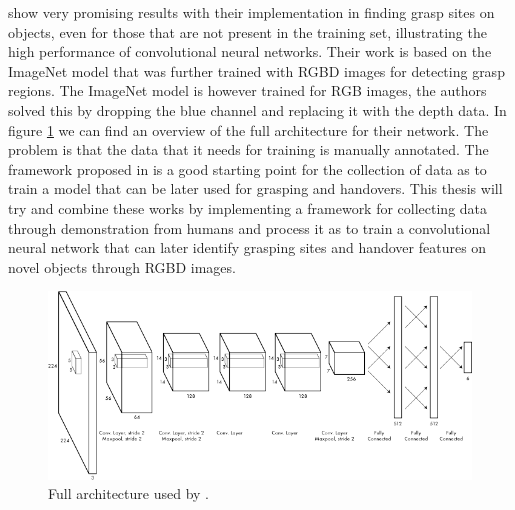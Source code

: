 \textcite{Redmon2014} show very promising results with their implementation in finding grasp sites on objects, even for those that are not present in the training set, illustrating the high performance of convolutional neural networks. Their work is based on the ImageNet model that was further trained with RGBD images for detecting grasp regions. The ImageNet model is however trained for RGB images, the authors solved this by dropping the blue channel and replacing it with the depth data. In figure \ref{fig:rel__cnn-arch} we can find an overview of the full architecture for their network. The problem is that the data that it needs for training is manually annotated. The framework proposed in \parencite{Chan2015a} is a good starting point for the collection of data as to train a model that can be later used for grasping and handovers. This thesis will try and combine these works by implementing a framework for collecting data through demonstration from humans and process it as to train a convolutional neural network that can later identify grasping sites and handover features on novel objects through RGBD images.

\begin{figure}
	\centering
	\includegraphics[width=\textwidth]{img/related-work/cnn-architecture.png}
	\caption{Full architecture used by \textcite{Redmon2014}.}
	\label{fig:rel__cnn-arch}
\end{figure}
